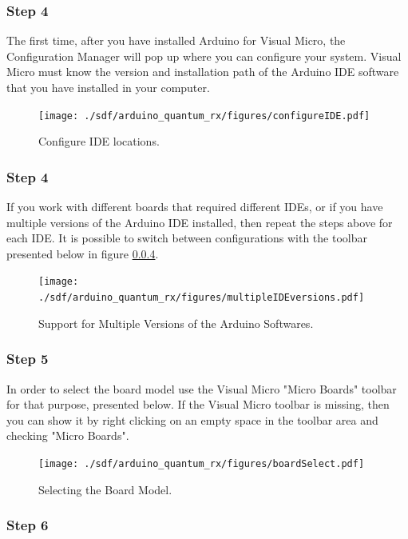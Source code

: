 \begin{refsection}
	\subsubsection{Step 4}
	
	The first time, after you have installed Arduino for Visual Micro, the Configuration Manager will pop up where you can configure your system. Visual Micro must know the version and installation path of the Arduino IDE software that you have installed in your computer.
	
	\begin{figure}[H]
		\centering
		\texttt{[image: ./sdf/arduino\_quantum\_rx/figures/configureIDE.pdf]}
		\caption{Configure IDE locations.}
		\label{configureIDE}
	\end{figure}
	
	\subsubsection{Step 4}
	If you work with different boards that required different IDEs, or if you have multiple versions of the Arduino IDE installed, then repeat the steps above for each IDE. It is possible to switch between configurations with the toolbar presented below in figure \ref{}.
	
	\begin{figure}[H]
		\centering
		\texttt{[image: ./sdf/arduino\_quantum\_rx/figures/multipleIDEversions.pdf]}
		\caption{Support for Multiple Versions of the Arduino Softwares.}
		\label{multipleIDEversions}
	\end{figure}
	
	
	\subsubsection{Step 5}
	
	In order to select the board model use the Visual Micro "Micro Boards" toolbar for that purpose, presented below. If the Visual Micro toolbar is missing, then you can show it by right clicking on an empty space in the toolbar area and checking "Micro Boards".
	
	
	\begin{figure}[H]
		\centering
		\texttt{[image: ./sdf/arduino\_quantum\_rx/figures/boardSelect.pdf]}
		\caption{Selecting the Board Model.}
		\label{boardSelect}
	\end{figure}
	
	\subsubsection{Step 6}
	

\end{refsection}

